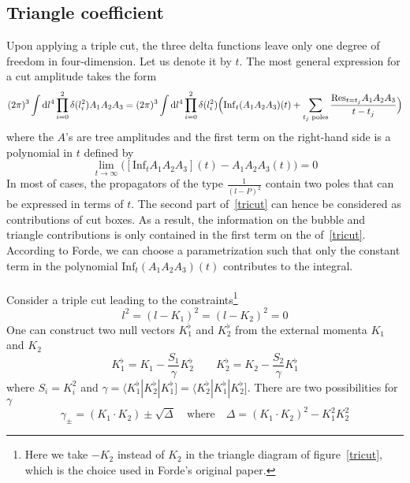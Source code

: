 \subsection*{Triangle coefficient} 
Upon applying a triple cut, the three delta functions leave only one degree of freedom in four-dimension. 
Let us denote it by $t$.
The most general expression for a cut amplitude takes the form 
\begin{equation}\label{tricut}
(2\pi)^3\int\textrm{d} l^4 \prod_{i=0}^2 \delta(l_i^2) A_1A_2A_3 = 
(2\pi)^3\int\textrm{d} l^4 \prod_{i=0}^2 \delta(l_i^2)\Big(\mathrm{Inf}_t(A_1A_2A_3)(t) + \sum_{\textrm{$t_j$ poles}}\frac{\mathrm{Res}_{t = t_j}A_1 A_2 A_3}{t-t_j}\Big)
\end{equation}
where the $A$'s are tree amplitudes and the first term on the right-hand side is a polynomial in $t$ defined by
\begin{equation*}
\lim_{t\rightarrow\infty}\big([\mathrm{Inf}_tA_1A_2A_3](t) - A_1A_2A_3(t)\big) = 0
\end{equation*}
In most of cases, the propagators of the type $\frac{1}{(l-P)^2}$ contain two poles that can be expressed in terms of $t$. 
The second part of~\cref{tricut} can hence be considered as contributions of cut boxes. 
As a result, the information on the bubble and triangle contributions is only contained in the first term on the \rhs of~\cref{tricut}.
According to Forde, we can choose a parametrization such that only the constant term in the polynomial $\mathrm{Inf}_t(A_1A_2A_3)(t)$ contributes to the integral. 
%
\\\\
Consider a triple cut leading to the constraints\footnote{Here we take $-K_2$ instead of $K_2$ in the triangle diagram of figure~\ref{tricut}, which is the choice used in Forde's original paper.}
\begin{equation*}
l^2 = (l-K_1)^2 = (l - K_2)^2 = 0
\end{equation*}
One can construct two null vectors $K_1^\flat$ and $K_2^\flat$ from the external momenta $K_1$ and $K_2$ 
\begin{equation}\label{k_flat}
K_1^\flat = K_1 - \frac{S_1}{\gamma}K_2^\flat \quad\quad
K_2^\flat = K_2 - \frac{S_2}{\gamma}K_1^\flat
\end{equation}
%
where $S_i = K_i^2$ and $\gamma = \langle K_1^\flat|K_2^\flat|K_1^\flat] =\langle K_2^\flat|K_1^\flat|K_2^\flat]$.
There are two possibilities for $\gamma$
\begin{equation}\label{sol_for_gamma}
\gamma_{\pm} = (K_1\cdot K_2) \pm\sqrt{\Delta}\quad
\mathrm{where}\quad
\Delta = (K_1\cdot K_2)^2 - K_1^2K_2^2
\end{equation}
